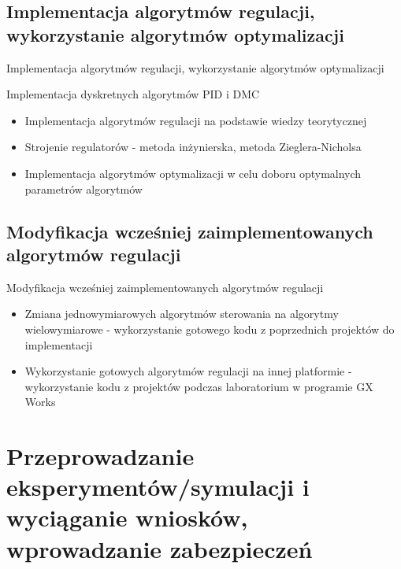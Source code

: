 \documentclass{beamer}
\begin{document}
	\subsection{Implementacja algorytmów regulacji, wykorzystanie algorytmów optymalizacji}
	\begin{frame}{Implementacja algorytmów regulacji, wykorzystanie algorytmów optymalizacji}
		\begin{block}{Implementacja dyskretnych algorytmów PID i DMC}
			\begin{itemize}
				\item Implementacja algorytmów regulacji na podstawie wiedzy teorytycznej
				\item Strojenie regulatorów - metoda inżynierska, metoda Zieglera-Nicholsa
				\item Implementacja algorytmów optymalizacji w celu doboru optymalnych parametrów algorytmów
			\end{itemize}
		\end{block}
	\end{frame}
	
	\subsection{Modyfikacja wcześniej zaimplementowanych algorytmów regulacji}
	\begin{frame}{Modyfikacja wcześniej zaimplementowanych algorytmów regulacji}
		\begin{itemize}
			\item Zmiana jednowymiarowych algorytmów sterowania na algorytmy wielowymiarowe - wykorzystanie gotowego kodu z poprzednich projektów do implementacji
			\item Wykorzystanie gotowych algorytmów regulacji na innej platformie - wykorzystanie kodu z projektów podczas laboratorium w programie GX Works
		\end{itemize}
	\end{frame}

\section{Przeprowadzanie eksperymentów/symulacji i wyciąganie wniosków, wprowadzanie zabezpieczeń}
\end{document}
